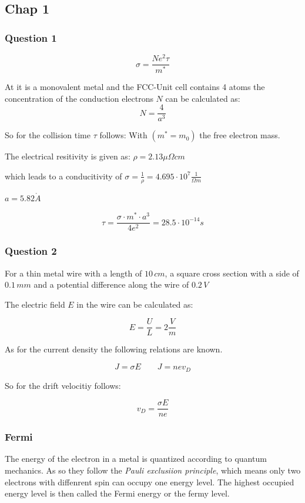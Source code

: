 \subsection{Chap 1 } \label{chap1}

\subsubsection*{Question 1}

\begin{equation}
    \sigma = \frac{N e^2 \tau}{m^*}
\end{equation}


At it is a monovalent metal and the FCC-Unit cell contains 
4 atoms the concentration of the conduction electrons $N$ can be
calculated as:
$$N =\frac{4}{a^3}$$

So for the collision time $\tau$ follows:
With $(m^* = m_0)$ the free electron mass.

The electrical resitivity is given as:
$\rho = 2.13 \mu \Omega cm$

which leads to a conducitivity of
$\sigma = \frac{1}{\rho} = 4.695\cdot 10^7 \frac{1}{\Omega m}$

$a = 5.82 \mathring{A}$

$$\tau =\frac{\sigma \cdot m^* \cdot a^3}{4e^2} = 28.5 \cdot 10^{-14}s$$

\subsubsection*{Question 2}

For a thin metal wire with a length of $10 \, cm$, a square cross section with 
a side of $0.1 \, mm$ and a potential difference along the wire of $0.2 \, V$

The electric field $E$ in the wire can be calculated as: 

$$E = \frac{U}{L} = 2 \frac{V}{m}$$

As for the current density the following relations are known.

$$J = \sigma E \qquad J = nev_D$$

So for the drift velocitiy follows:

$$v_D =  \frac{\sigma E}{n e}$$

\subsubsection*{Fermi}

The energy of the electron in a metal is quantized according to quantum mechanics.
As so they follow the \textit{Pauli exclusiion principle}, which means only two 
electrons with diffenrent spin can occupy one energy level.
The highest occupied energy level is then called the Fermi energy or the fermy
level.


